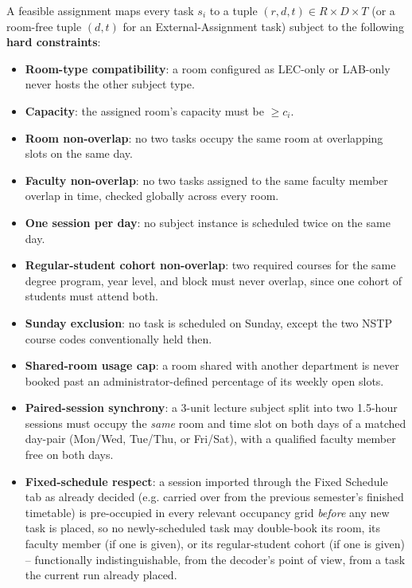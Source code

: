 \documentclass[conference]{IEEEtran}
\begin{document}
A feasible assignment maps every task $s_i$ to a tuple $(r, d, t) \in R \times D \times T$ (or a room-free tuple $(d,t)$ for an External-Assignment task) subject to the following \textbf{hard constraints}:

\begin{itemize}
\item[H1] \textbf{Room-type compatibility}: a room configured as LEC-only or LAB-only never hosts the other subject type.
\item[H2] \textbf{Capacity}: the assigned room's capacity must be $\geq c_i$.
\item[H3] \textbf{Room non-overlap}: no two tasks occupy the same room at overlapping slots on the same day.
\item[H4] \textbf{Faculty non-overlap}: no two tasks assigned to the same faculty member overlap in time, checked globally across every room.
\item[H5] \textbf{One session per day}: no subject instance is scheduled twice on the same day.
\item[H6] \textbf{Regular-student cohort non-overlap}: two required courses for the same degree program, year level, and block must never overlap, since one cohort of students must attend both.
\item[H7] \textbf{Sunday exclusion}: no task is scheduled on Sunday, except the two NSTP course codes conventionally held then.
\item[H8] \textbf{Shared-room usage cap}: a room shared with another department is never booked past an administrator-defined percentage of its weekly open slots.
\item[H9] \textbf{Paired-session synchrony}: a 3-unit lecture subject split into two 1.5-hour sessions must occupy the \emph{same} room and time slot on both days of a matched day-pair (Mon/Wed, Tue/Thu, or Fri/Sat), with a qualified faculty member free on both days.
\item[H10] \textbf{Fixed-schedule respect}: a session imported through the Fixed Schedule tab as already decided (e.g. carried over from the previous semester's finished timetable) is pre-occupied in every relevant occupancy grid \emph{before} any new task is placed, so no newly-scheduled task may double-book its room, its faculty member (if one is given), or its regular-student cohort (if one is given) -- functionally indistinguishable, from the decoder's point of view, from a task the current run already placed.
\end{itemize}
\end{document}
